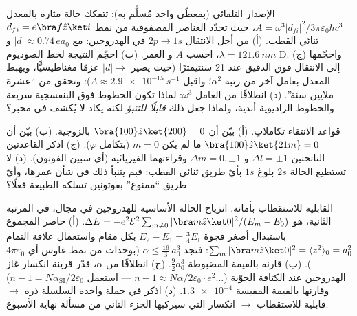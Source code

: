 \begin{exercise}[$\star\star$]\label{exo:b3:perturbation-theory:8}
الإصدار التلقائي (بمعطًى واحد مُسلَّم به): تتفكك حالة مثارة
بالمعدل $A = \omega^3|d_{fi}|^2/3\pi\varepsilon_0\hbar c^3$،
حيث تحدّد العناصر المصفوفية من نمط $d_{fi} = e\bra f\hat z\ket i$
ثنائي القطب. (أ) من أجل الانتقال $2p \to 1s$ في الهدروجين: مع $|d| \approx 0.74\,
ea_0$ و $\lambda = \qty{121.6}{nm}$، احسب $A$ و
العمر. (ب) احجّم النتيجة لخط الصوديوم D. (ج) واحجّمها إلى
الانتقال فوق الدقيق عند 21 سنتيمترًا (حيث يصير $|d| \to$ عزمًا مغناطيسيًّا، ويهبط المعدل
بعامل آخر من رتبة $\alpha^2$؛ واقبل $A \approx
\qty{2.9e-15}{s^{-1}}$): وتحقق من ``عشرة ملايين سنة''. (د)
انطلاقًا من العامل $\omega^3$: لماذا تكون الخطوط فوق البنفسجية سريعة والخطوط
الراديوية أبدية، ولماذا جعل ذلك 
\emph{قابلًا للتنبؤ} لكنه يكاد لا يُكشف في مخبر؟
\end{exercise}

\begin{exercise}[$\star\star$]\label{exo:b3:perturbation-theory:9}
قواعد الانتقاء تكاملاتٍ. (أ) بيّن أن $\bra{100}\hat z\ket{200} =
0$ بالزوجية. (ب) بيّن أن $\bra{100}\hat z\ket{21m} = 0$ ما لم يكن $m =
0$ (بتكامل $\varphi$). (ج) اذكر القاعدتين الناتجتين $\Delta
l = \pm1$ و $\Delta m = 0, \pm1$ وقراءتهما الفيزيائية (أي
سبين الفوتون). (د) لا تستطيع الحالة $2s$ بلوغ $1s$ بأيّ
طريق ثنائي القطب: فبم يتنبأ ذلك في شأن عمرها، وأيّ
طريق ``ممنوع'' بفوتونين تسلكه الطبيعة فعلًا؟
\end{exercise}

\begin{exercise}[$\star\star\star$]\label{exo:b3:perturbation-theory:10}
القابلية للاستقطاب بأمانة. انزياح الحالة الأساسية للهدروجين
في مجال، في المرتبة الثانية، هو $\Delta E = -e^2\mathcal E^2\sum_{m\neq
0}|\bra m\hat z\ket 0|^2/(E_m - E_0)$. (أ) حاصر المجموع باستبدال
أصغر فجوة $E_2 - E_1 =
\tfrac34 E_{\text{I}}$ بكل مقام واستعمال علاقة التمام $\sum_m|\bra
m\hat z\ket0|^2 = \langle z^2\rangle_0 = a_0^2$: فتجد $\alpha
\le \tfrac{16}3\,a_0^3$ (بوحدات من نمط غاوس أي
$4\pi\varepsilon_0$). (ب) قارنه بالقيمة المضبوطة $\tfrac92 a_0^3$.
(ج) انطلاقًا من $\alpha$، قدّر قرينة انكسار غاز الهدروجين
عند الكثافة الجوّية ($n - 1 \approx N\alpha/2\varepsilon_0
\cdot e^2\dots$ --- استعمل $n - 1 = N\alpha_{\text{SI}}/2
\varepsilon_0$) وقارنها بالقيمة المقيسة $\num{1.3e-4}$.
(د) اذكر في جملة واحدة السلسلة ذرة $\to$ قابلية للاستقطاب
$\to$ انكسار التي سيركبها الجزء الثاني من مسألة نهاية الأسبوع.
\end{exercise}

